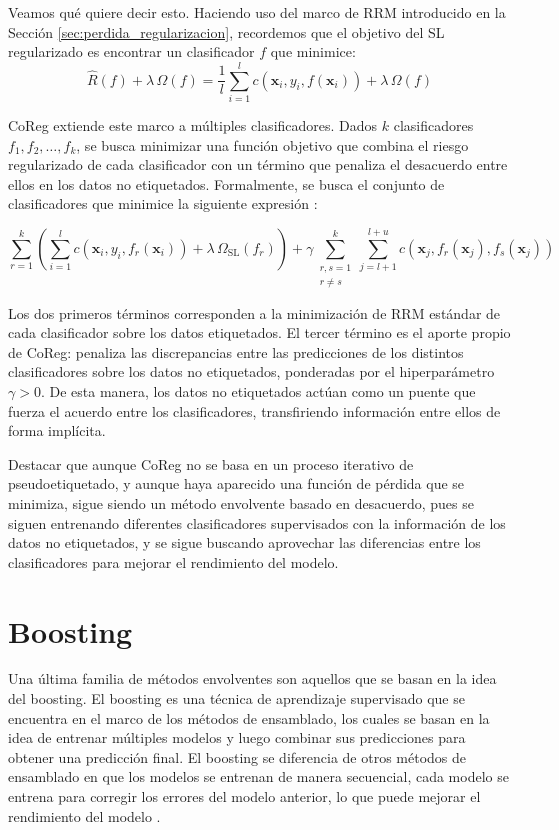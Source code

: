 Veamos qué quiere decir esto. Haciendo uso del marco de \gls{RRM} introducido en la Sección \ref{sec:perdida_regularizacion}, recordemos que el objetivo del \gls{SL} regularizado es encontrar un clasificador $f$ que minimice:
$$\hat{R}(f) + \lambda\, \Omega(f) = \frac{1}{l}\sum_{i=1}^{l} c(\mathbf{x}_i, y_i, f(\mathbf{x}_i)) + \lambda\, \Omega(f)$$

\gls{CoReg} extiende este marco a múltiples clasificadores. Dados $k$ clasificadores $f_1, f_2, \ldots, f_k$, se busca minimizar una función objetivo que combina el riesgo regularizado de cada clasificador con un término que penaliza el desacuerdo entre ellos en los datos no etiquetados. Formalmente, se busca el conjunto de clasificadores que minimice la siguiente expresión \cite{sindhwani2008rkhs}:

\begin{equation}
    \sum_{r=1}^{k} \left(\sum_{i=1}^{l} c(\mathbf{x}_i, y_i, f_r(\mathbf{x}_i)) + \lambda \,\Omega_{\text{SL}}(f_r) \right) + \gamma \sum_{\substack{r,s=1 \\ r \neq s}}^{k} \sum_{j=l+1}^{l+u} c(\mathbf{x}_j, f_r(\mathbf{x}_j), f_s(\mathbf{x}_j))
\end{equation}

Los dos primeros términos corresponden a la minimización de \gls{RRM} estándar de cada clasificador sobre los datos etiquetados. El tercer término es el aporte propio de \gls{CoReg}: penaliza las discrepancias entre las predicciones de los distintos clasificadores sobre los datos no etiquetados, ponderadas por el hiperparámetro $\gamma > 0$. De esta manera, los datos no etiquetados actúan como un puente que fuerza el acuerdo entre los clasificadores, transfiriendo información entre ellos de forma implícita.

Destacar que aunque \gls{CoReg} no se basa en un proceso iterativo de pseudoetiquetado, y aunque haya aparecido una función de pérdida que se minimiza, sigue siendo un método envolvente basado en desacuerdo, pues se siguen entrenando diferentes clasificadores supervisados con la información de los datos no etiquetados, y se sigue buscando aprovechar las diferencias entre los clasificadores para mejorar el rendimiento del modelo.

\section{Boosting}

Una última familia de métodos envolventes son aquellos que se basan en la idea del boosting. El boosting es una técnica de aprendizaje supervisado que se encuentra en el marco de los métodos de ensamblado, los cuales se basan en la idea de entrenar múltiples modelos  y luego combinar sus predicciones para obtener una predicción final. El boosting se diferencia de otros métodos de ensamblado en que los modelos se entrenan de manera secuencial, cada modelo se entrena para corregir los errores del modelo anterior, lo que puede mejorar el rendimiento del modelo \cite{zhou2025ensemble}.


